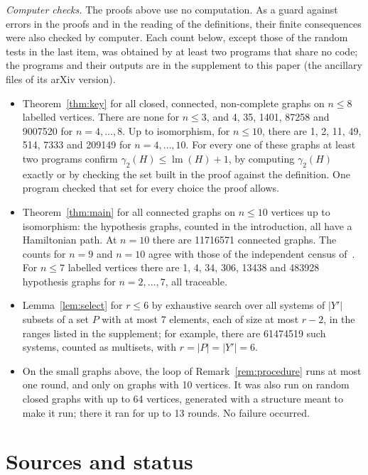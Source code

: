 \documentclass[11pt,a4paper]{article}
\theoremstyle{remark}
\newcommand{\lm}{\operatorname{lm}}
\begin{document}
\emph{Computer checks.} The proofs above use no computation. As a guard against errors in the
proofs and in the reading of the definitions, their finite consequences were also checked by
computer. Each count below, except those of the random tests in the last item, was obtained by at
least two programs that share no code; the
programs and their outputs are in the supplement to this paper (the ancillary files of its arXiv
version).
\begin{itemize}
\item Theorem~\ref{thm:key} for all closed, connected, non-complete graphs on $n\le 8$ labelled
  vertices. There are none for $n\le 3$, and 4, 35, 1401, 87258 and 9007520 for $n=4,\dots,8$.
  Up to isomorphism, for $n\le 10$, there are 1, 2, 11, 49, 514, 7333 and 209149 for
  $n=4,\dots,10$. For every one of these graphs at least two programs confirm
  $\gamma_2(H)\le\lm(H)+1$, by computing $\gamma_2(H)$ exactly or by checking the set built in
  the proof against the definition. One program checked that set for every choice the proof
  allows.
\item Theorem~\ref{thm:main} for all connected graphs on $n\le 10$ vertices up to isomorphism:
  the hypothesis graphs, counted in the introduction, all have a Hamiltonian path. At $n=10$
  there are 11716571 connected graphs. The counts for $n=9$ and $n=10$ agree with those of the
  independent census of~\cite{aiv}. For $n\le 7$ labelled vertices there are 1, 4, 34, 306,
  13438 and 483928 hypothesis graphs for $n=2,\dots,7$, all traceable.
\item Lemma~\ref{lem:select} for $r\le 6$ by exhaustive search over all systems of $|Y'|$
  subsets of a set $P$ with at most 7 elements, each of size at most $r-2$, in the ranges listed
  in the supplement; for example, there are 61474519 such systems, counted as multisets, with
  $r=|P|=|Y'|=6$.
\item On the small graphs above, the loop of Remark~\ref{rem:procedure} runs at most one round,
  and only on graphs with 10 vertices. It was also run on random closed graphs with up to 64
  vertices, generated with a structure meant to make it run; there it ran for up to 13 rounds. No
  failure occurred.
\end{itemize}

\section*{Sources and status}
\end{document}
